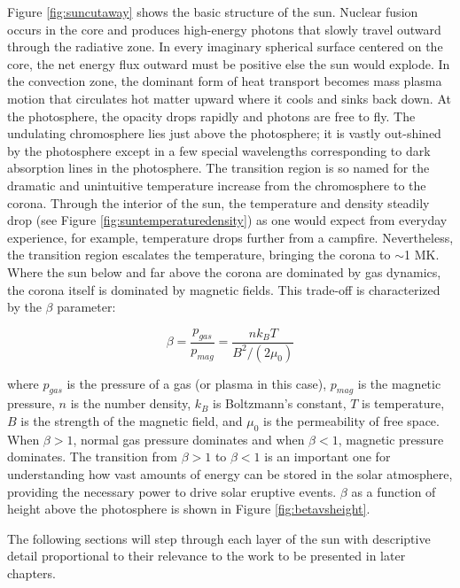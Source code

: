 Figure \ref{fig:suncutaway} shows the basic structure of the sun. Nuclear fusion occurs in the core and produces high-energy photons that slowly travel outward through the radiative zone. In every imaginary spherical surface centered on the core, the net energy flux outward must be positive else the sun would explode. In the convection zone, the dominant form of heat transport becomes mass plasma motion that circulates hot matter upward where it cools and sinks back down. At the photosphere, the opacity drops rapidly and photons are free to fly. The undulating chromosphere lies just above the photosphere; it is vastly out-shined by the photosphere except in a few special wavelengths corresponding to dark absorption lines in the photosphere. The transition region is so named for the dramatic and unintuitive temperature increase from the chromosphere to the corona. Through the interior of the sun, the temperature and density steadily drop (see Figure \ref{fig:suntemperaturedensity}) as one would expect from everyday experience, for example, temperature drops further from a campfire. Nevertheless, the transition region escalates the temperature, bringing the corona to $\sim$1 MK. Where the sun below and far above the corona are dominated by gas dynamics, the corona itself is dominated by magnetic fields. This trade-off is characterized by the $\beta$ parameter:

\begin{equation}
    \label{eq:beta}
    \beta = \frac{p_{gas}}{p_{mag}} = \frac{nk_BT}{B^2/(2\mu_0)}
\end{equation}

\noindent where $p_{gas}$ is the pressure of a gas (or plasma in this case), $p_{mag}$ is the magnetic pressure, $n$ is the number density, $k_B$ is Boltzmann's constant, $T$ is temperature, $B$ is the strength of the magnetic field, and $\mu_0$ is the permeability of free space. When $\beta > 1$, normal gas pressure dominates and when $\beta < 1$, magnetic pressure dominates. The transition from $\beta > 1$ to $\beta < 1$ is an important one for understanding how vast amounts of energy can be stored in the solar atmosphere, providing the necessary power to drive solar eruptive events. $\beta$ as a function of height above the photosphere is shown in Figure \ref{fig:betavsheight}. 

The following sections will step through each layer of the sun with descriptive detail proportional to their relevance to the work to be presented in later chapters. 

